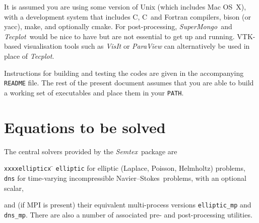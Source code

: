 \documentclass[11pt]{report}
\newcommand{\Semtex}{\emph{Semtex}} \newcommand{\Dog}{\emph{Dog}}
\newcommand{\SM}{\emph{SuperMongo}}
\newcommand{\Tecplot}{\emph{Tecplot}}
\newcommand\NavSto{Navier--Stokes}
\newcommand\cpp{C\nolinebreak\hspace{-.05em}\raisebox{.3ex}{\footnotesize\bf
+}\nolinebreak\hspace{-.10em}\raisebox{.3ex}{\footnotesize\bf+}}
\begin{document}
It is assumed you are using some version of Unix (which includes Mac
OS~X), with a development system that includes C, \cpp\ and Fortran
compilers, bison (or yacc), make, and optionally cmake. For
post-processing, \SM\ and \Tecplot\ would be nice to have but are
not essential to get up and running. VTK-based visualisation tools
such as \emph{VisIt} or \emph{ParaView} can alternatively be used in
place of \Tecplot.

Instructions for building and testing the codes are given in the
accompanying \texttt{README} file.  The rest of the present document
assumes that you are able to build a working set of executables and
place them in your \texttt{PATH}.

\section{Equations to be solved}

The central solvers provided by the \Semtex\ package are
\begin{tabbing}
\texttt{xxxxellipticx} \= \kill
\hspace*{4ex}\texttt{elliptic} \> for elliptic (Laplace, Poisson, Helmholtz)
problems,\\
\hspace*{4ex}\texttt{dns} \> for time-varying incompressible
\NavSto\ problems, with an optional scalar,
\end{tabbing}
and (if MPI is present) their equivalent multi-process versions
\texttt{elliptic\_mp} and \texttt{dns\_mp}.  There are also a number
of associated pre- and post-processing utilities.
\end{document}
